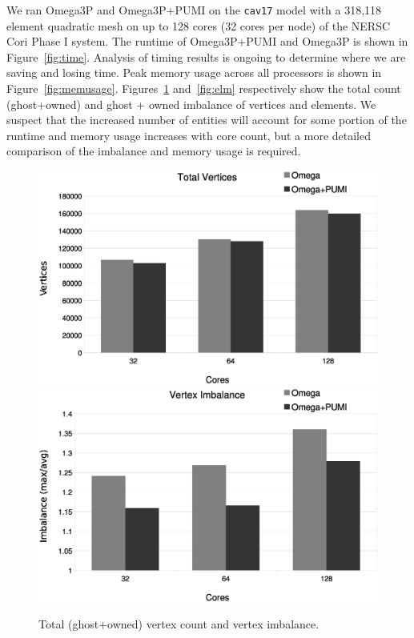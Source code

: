 \documentclass[a4paper]{article}
\begin{document}
We ran Omega3P and Omega3P+PUMI on the \texttt{cav17} model with a 318,118
element quadratic mesh on up to 128 cores (32 cores per node) of the NERSC Cori
Phase I system.
The runtime of Omega3P+PUMI and Omega3P is shown in Figure~\ref{fig:time}.
Analysis of timing results is ongoing to determine where we are saving and
losing time.
Peak memory usage across all processors is shown in Figure~\ref{fig:memusage}.
Figures~\ref{fig:vtx} and~\ref{fig:elm} respectively show the total count
(ghost+owned) and ghost + owned imbalance of vertices and
elements.
We suspect that the increased number of entities will account for some portion
of the runtime and memory usage increases with core count, but a more detailed
comparison of the imbalance and memory usage is required.
\begin{figure}[ht]
\centering
  \includegraphics[width=\textwidth]{total-vtx.eps} \\
  \includegraphics[width=\textwidth]{vtx-imb.eps} \\
  \caption{\label{fig:vtx} Total (ghost+owned) vertex count and vertex imbalance.}
\end{figure}
\end{document}

